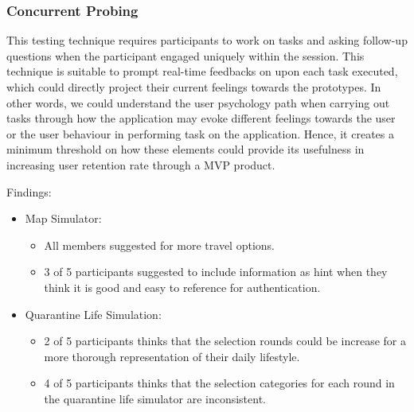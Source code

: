     \subsubsection{Concurrent Probing}
      \par This testing technique requires participants to work on tasks and asking follow-up questions when the participant engaged uniquely within the session. This technique is suitable to prompt real-time feedbacks on upon each task executed, which could directly project their current feelings towards the prototypes. In other words, we could understand the user psychology path when carrying out tasks through how the application may evoke different feelings towards the user or the user behaviour in performing task on the application. Hence, it creates a minimum threshold on how these elements could provide its usefulness in increasing user retention rate through a MVP product.
      \par Findings:
        \begin{itemize}
          \item Map Simulator:
            \begin{itemize}
              \item All members suggested for more travel options. 
              \item 3 of 5 participants suggested to include information as hint when they think it is good and easy to reference for authentication.
            \end{itemize}
          \item Quarantine Life Simulation:
            \begin{itemize}
              \item 2 of 5 participants thinks that the selection rounds could be increase for a more thorough representation of their daily lifestyle.
              \item 4 of 5 participants thinks that the selection categories for each round in the quarantine life simulator are inconsistent. 
            \end{itemize}
        \end{itemize}

